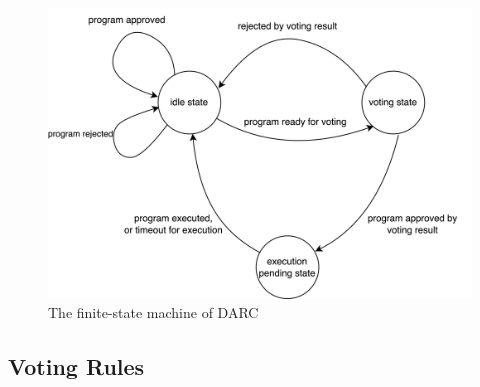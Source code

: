 \documentclass[main.tex]{subfiles}
\begin{document}
\begin{figure}
\centering
\includegraphics[width=1\linewidth]{finite_state_machine.drawio.large.png}
\caption{\label{fig:FSM}The finite-state machine of DARC}
\end{figure}

\subsection{Voting Rules}
\end{document}
